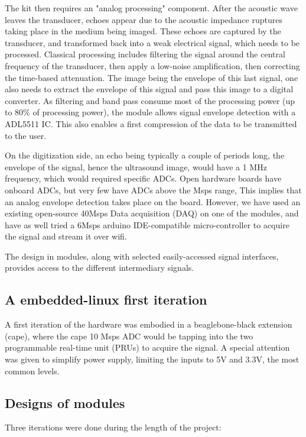 \documentclass[letterpaper, 10 pt, conference]{ieeeconf} %
\begin{document}
The kit then requires an "analog processing" component. After the acoustic wave leaves the transducer, echoes appear due to the acoustic impedance ruptures taking place in the medium being imaged. These echoes are captured by the transducer, and transformed back into a weak electrical signal, which needs to be processed. Classical processing includes filtering the signal around the central frequency of the transducer, then apply a low-noise amplification, then correcting the time-based attenuation. The image being the envelope of this last signal, one also needs to extract the envelope of this signal and pass this image to a digital converter. As filtering and band pass consume most of the processing power (up to 80\% of processing power)\cite{c11}, the module allows signal envelope detection with a ADL5511 IC. This also enables a first compression of the data to be transmitted to the user.

On the digitization side, an echo being typically a couple of periods long, the envelope of the signal, hence the ultrasound image, would have a 1 MHz frequency, which would required specific ADCs. Open hardware boards have onboard ADCs, but very few have ADCs above the Msps range, This implies that an analog envelope detection takes place on the board. However, we have used an existing open-source 40Msps Data acquisition (DAQ) on one of the modules, and have as well tried a 6Msps arduino IDE-compatible micro-controller to acquire the signal and stream it over wifi.

The design in modules, along with selected easily-accessed signal interfaces, provides access to the different intermediary signals.


\subsection{A embedded-linux first iteration}

A first iteration of the hardware was embodied in a beaglebone-black extension (cape), where the cape 10 Msps ADC would be tapping into the two programmable real-time unit (PRUs) to acquire the signal. A special attention was given to simplify power supply, limiting the inputs to 5V and 3.3V, the most common levels.

\subsection{Designs of modules}

Three iterations were done during the length of the project: 
\end{document}
